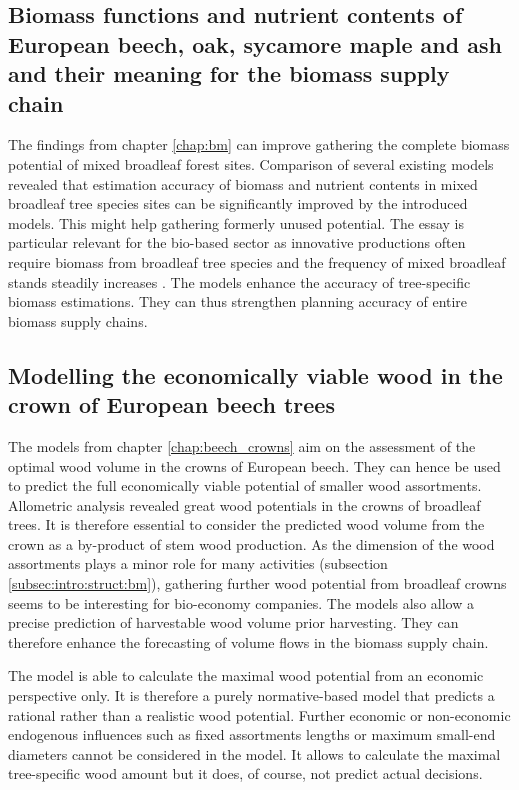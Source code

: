 \subsection{Biomass functions and nutrient contents of European beech, oak, sycamore maple and ash and their meaning for the biomass supply chain}
\label{subsec:discussion:struct:bm}
The findings from chapter \ref{chap:bm} can improve gathering the complete biomass potential of mixed broadleaf forest sites. Comparison of several existing models revealed that estimation accuracy of biomass and nutrient contents in mixed broadleaf tree species sites can be significantly improved by the introduced models. This might help gathering formerly unused potential. The essay is particular relevant for the bio-based sector as innovative productions often require biomass from broadleaf tree species \citep[p. 1]{auer_2016} and the frequency of mixed broadleaf stands steadily increases \citep{ti_2014}. The models enhance the accuracy of tree-specific biomass estimations. They can thus strengthen planning accuracy of entire biomass supply chains.

\subsection{Modelling the economically viable wood in the crown of European beech trees}
\label{subsec:discussion:struct:beech_crowns}
The models from chapter \ref{chap:beech_crowns} aim on the assessment of the optimal wood volume in the crowns of European beech. They can hence be used to predict the full economically viable potential of smaller wood assortments. Allometric analysis revealed great wood potentials in the crowns of broadleaf trees. It is therefore essential to consider the predicted wood volume from the crown as a by-product of stem wood production. As the dimension of the wood assortments plays a minor role for many activities (subsection \ref{subsec:intro:struct:bm}), gathering further wood potential from broadleaf crowns seems to be interesting for bio-economy companies. The models also allow a precise prediction of harvestable wood volume prior harvesting. They can therefore enhance the forecasting of volume flows in the biomass supply chain.

The model is able to calculate the maximal wood potential from an economic perspective only. It is therefore a purely normative-based model that predicts a rational rather than a realistic wood potential. Further economic or non-economic endogenous influences such as fixed assortments lengths or maximum small-end diameters cannot be considered in the model. It allows to calculate the maximal tree-specific wood amount but it does, of course, not predict actual decisions.


